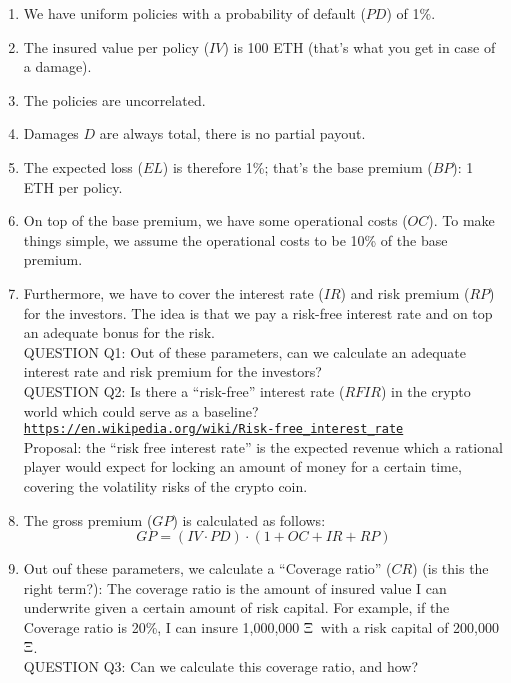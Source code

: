 \documentclass[runningheads,a4paper]{llncs}
\newcommand{\ETH}{$\Upxi$}
\begin{document}
\begin{enumerate}
    \item We have uniform policies with a probability of default ($PD$) of 1\%.
    \item The insured value per policy ($IV$) is 100 ETH (that’s what you get in case of a damage).
    \item The policies are uncorrelated. 
    \item Damages $D$ are always total, there is no partial payout. 
    \item The expected loss ($EL$) is therefore 1\%; that’s the base premium ($BP$): 1 ETH per policy.
    \item On top of the base premium, we have some operational costs ($OC$). 
    To make things simple, we assume the operational costs to be 10\% of the base premium.
    \item Furthermore, we have to cover the interest rate ($IR$) and risk premium ($RP$) for the investors. 
    The idea is that we pay a risk-free interest rate and on top an adequate bonus for the risk. \\
    QUESTION Q1: Out of these parameters, can we calculate an adequate interest rate and risk premium for the investors? \\
    QUESTION Q2: Is there a “risk-free” interest rate ($RFIR$) in the crypto world which could serve as a baseline? \\
    \texttt{\href{https://en.wikipedia.org/wiki/Risk-free_interest_rate}
    {https://en.wikipedia.org/wiki/Risk-free\_interest\_rate}}\\
    Proposal: the ``risk free interest rate'' is the expected revenue which a rational player
    would expect for locking an amount of money for a certain time, covering the volatility risks of the crypto coin.
    \item The gross premium ($GP$) is calculated as follows:
    \begin{equation} \label{eq:GP1} GP = (IV \cdot PD) \cdot (1 + OC + IR + RP) \end{equation}
    \item Out ouf these parameters, we calculate a “Coverage ratio” ($CR$) (is this the right term?): 
    The coverage ratio is the amount of insured value I can underwrite given a certain amount of risk capital.
    For example, if the Coverage ratio is 20\%, I can insure 1,000,000 \ETH\ with a risk capital of 200,000 \ETH.\\
    QUESTION Q3: Can we calculate this coverage ratio, and how?
\end{enumerate}
\end{document}
